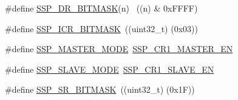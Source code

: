 \begin{DoxyCompactItemize}
$$\item 
\#define \hyperlink{group__SSP__17XX__40XX_ga48ac9207e05fd0e569f64e290a07f53b}{S\+S\+P\+\_\+\+D\+R\+\_\+\+B\+I\+T\+M\+A\+SK}(n)  ~((n) \& 0x\+F\+F\+F\+F)
\item 
\#define \hyperlink{group__SSP__17XX__40XX_ga5ce108586bfd5b77c849aa9969c8973c}{S\+S\+P\+\_\+\+I\+C\+R\+\_\+\+B\+I\+T\+M\+A\+SK}~((uint32\+\_\+t) (0x03))
\item 
\#define \hyperlink{group__SSP__17XX__40XX_ga3c9cbd4f4b8169253d26f4d40cdc414d}{S\+S\+P\+\_\+\+M\+A\+S\+T\+E\+R\+\_\+\+M\+O\+DE}~\hyperlink{group__SSP__17XX__40XX_gaa8e064b00be6db00e597ad2509a633c3}{S\+S\+P\+\_\+\+C\+R1\+\_\+\+M\+A\+S\+T\+E\+R\+\_\+\+EN}
\item 
\#define \hyperlink{group__SSP__17XX__40XX_gac6bc4b92810caa934b2d7116390098c6}{S\+S\+P\+\_\+\+S\+L\+A\+V\+E\+\_\+\+M\+O\+DE}~\hyperlink{group__SSP__17XX__40XX_ga483d570ffc25bc917c99b3e8ece75649}{S\+S\+P\+\_\+\+C\+R1\+\_\+\+S\+L\+A\+V\+E\+\_\+\+EN}
\item 
\#define \hyperlink{group__SSP__17XX__40XX_ga0fe66130dd87296b6e16cd9fbcf7daf1}{S\+S\+P\+\_\+\+S\+R\+\_\+\+B\+I\+T\+M\+A\+SK}~((uint32\+\_\+t) (0x1\+F))
\end{DoxyCompactItemize}
